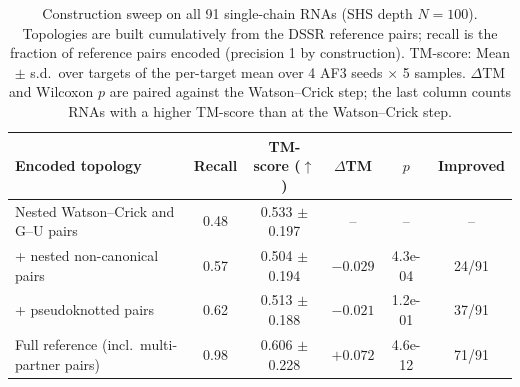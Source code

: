 \begin{table}[t]
\centering
\caption{Construction sweep on all 91 single-chain RNAs (SHS depth $N{=}100$). Topologies are built cumulatively from the DSSR reference pairs; recall is the fraction of reference pairs encoded (precision 1 by construction). TM-score: Mean $\pm$ s.d.\ over targets of the per-target mean over 4 AF3 seeds $\times$ 5 samples. $\Delta$TM and Wilcoxon $p$ are paired against the Watson--Crick step; the last column counts RNAs with a higher TM-score than at the Watson--Crick step.}
\label{tab:construct91}
\begin{tabular}{lccccc}
\toprule
Encoded topology & Recall & TM-score ($\uparrow$) & $\Delta$TM & $p$ & Improved \\
\midrule
Nested Watson--Crick and G--U pairs & 0.48 & 0.533 $\pm$ 0.197 & -- & -- & -- \\
+ nested non-canonical pairs & 0.57 & 0.504 $\pm$ 0.194 & $-0.029$ & 4.3e-04 & 24/91 \\
+ pseudoknotted pairs & 0.62 & 0.513 $\pm$ 0.188 & $-0.021$ & 1.2e-01 & 37/91 \\
Full reference (incl.\ multi-partner pairs) & 0.98 & 0.606 $\pm$ 0.228 & $+0.072$ & 4.6e-12 & 71/91 \\
\bottomrule
\end{tabular}
\end{table}

